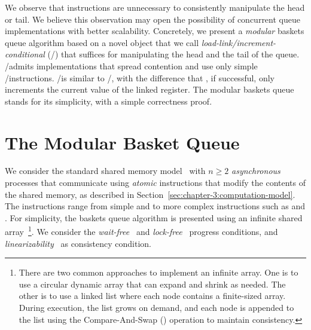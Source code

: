 We observe that \RMW instructions are unnecessary to consistently manipulate the head or tail. We believe this observation may open the possibility of concurrent queue implementations with better scalability. Concretely, we present a \emph{modular} baskets queue algorithm based on a novel object that we call \emph{load-link/increment-conditional} (\LL/\IC) that suffices for manipulating the head and the tail of the queue.  \LL/\IC admits implementations that spread contention and use only simple \R/\W instructions.  \LL/\IC is similar to \LL/\SC, with the difference that \IC, if successful, only increments the current value of the linked register. The modular baskets queue stands for its simplicity, with a simple correctness proof.

\section{The Modular Basket Queue}
\label{sec-basket-queue}

We consider the standard shared memory model~\cite{DBLP_journals_toplas_HerlihyW90} with $n \geq 2$ \emph{asynchronous} processes that communicate using \emph{atomic} instructions that modify the contents of the shared memory, as described in Section~\ref{sec:chapter-3:computation-model}. The instructions range from simple \R and \W to more complex \RMW instructions such as \FAI and \CAS. For simplicity, the baskets queue algorithm is presented using an infinite shared array~\footnote{There are two common approaches to implement an infinite array. One is to use a circular dynamic array that can expand and shrink as needed. The other is to use a linked list where each node contains a finite-sized array. During execution, the list grows on demand, and each node is appended to the list using the Compare-And-Swap (\CAS) operation to maintain consistency.}. We consider the \emph{wait-free}~\cite{DBLP_journals_toplas_Herlihy91} and \emph{lock-free}~\cite{DBLP_conf_opodis_HerlihyS11} progress conditions, and \emph{linearizability}~\cite{DBLP_journals_toplas_HerlihyW90} as consistency condition.

